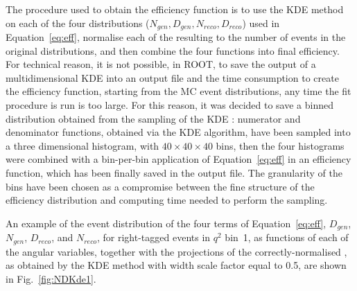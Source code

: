 The procedure used to obtain the efficiency function is to use the KDE method on each of the four distributions ($N_{gen}, D_{gen}, N_{reco}, D_{reco}$) used in Equation~\ref{eq:eff}, normalise each of the resulting \pdfs to the number of events in the original distributions, and then combine the four functions into final efficiency.
For technical reason, it is not possible, in ROOT, to save the output of a multidimensional KDE \pdf into an output file and the time consumption to create the efficiency function, starting from the MC event distributions, any time the fit procedure is run is too large.
For this reason, it was decided to save a binned distribution obtained from the sampling of the KDE \pdfs: numerator and denominator functions, obtained via the KDE algorithm, have been sampled into a three dimensional histogram, with $40\times40\times40$ bins, then the four histograms were combined with a bin-per-bin application of Equation~\ref{eq:eff} in an efficiency function, which has been finally saved in the output file.
The granularity of the bins have been chosen as a compromise between the fine structure of the efficiency distribution and computing time needed to perform the \pdf sampling.

An example of the event distribution of the four terms of Equation~\ref{eq:eff}, $D_{gen}$, $N_{gen}$, $D_{reco}$, and $N_{reco}$, for right-tagged events in $q^2$ bin~1, as functions of each of the angular variables, together with the projections of the correctly-normalised \pdfs, as obtained by the KDE method with width scale factor equal to 0.5, are shown in Fig.~\ref{fig:NDKde1}.







